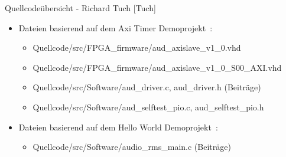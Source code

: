 \begin{frame}{Quellcodeübersicht - Richard Tuch [Tuch]}
    \begin{itemize}
        \item Dateien basierend auf dem Axi Timer Demoprojekt~\cite{at_demoprojekt}:
        \begin{itemize}
            \item Quellcode/src/FPGA\_firmware/aud\_axislave\_v1\_0.vhd
            \item Quellcode/src/FPGA\_firmware/aud\_axislave\_v1\_0\_S00\_AXI.vhd
            \item Quellcode/src/Software/aud\_driver.c, aud\_driver.h (Beiträge)
            \item Quellcode/src/Software/aud\_selftest\_pio.c, aud\_selftest\_pio.h
        \end{itemize}
        \item Dateien basierend auf dem Hello World Demoprojekt~\cite{hello_demoprojekt}:
        \begin{itemize}
            \item Quellcode/src/Software/audio\_rms\_main.c (Beiträge)
        \end{itemize}
    \end{itemize}
\end{frame}

